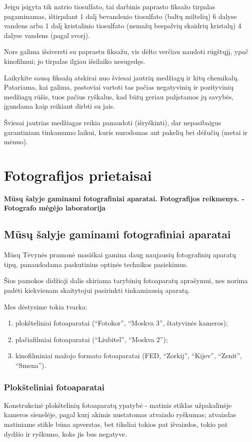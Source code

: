 \documentclass{book}
\begin{document}
				Jeigu įsigyta tik natrio tiosulfato, tai darbinis paprasto fiksažo tirpalas pagaminamas, ištirpdant 1 dalį bevandenio tiosulfato (baltų miltelių) 6 dalyse vandens arba 1 dalį kristalinio tiosulfato (nemažų bespalvių skaidrių kristalų) 4 dalyse vandens (pagal svorį).

				Nors galima išsiversti su paprastu fiksažu, vis dėlto verčiau naudoti rūgštųjį, ypač kinofilmui; jo tirpalas ilgiau išsilaiko nesugedęs.

				Laikykite sausą fiksažą atskirai nuo šviesai jautrių medžiagų ir kitų chemikalų.\\

				Patariama, kai galima, pastoviai vartoti tas pačias negatyvinių ir pozityvinių medžiagų rūšis, tuos pačius ryškalus, kad būtų geriau pažįstamos jų savybės, įgundama kaip reikiant dirbti su jais.

				Šviesai jautrias medžiagas reikia panaudoti (išryškinti), dar nepasibaigus garantiniam tinkamumo laikui, kuris nurodomas ant pakelių bei dėžučių (metai ir mėnuo).
	\chapter{Fotografijos prietaisai}
		\textbf{Mūsų šalyje gaminami fotografiniai aparatai. Fotografijos reikmenys. - Fotografo mėgėjo laboratorija}
		\section*{Mūsų šalyje gaminami fotografiniai aparatai}
			Mūsų Tėvynės pramonė masiškai gamina daug naujausių fotografinių aparatų tipų, panaudodama paskutinius optinės technikos pasiekimus.

			Šios pamokos didžioji dalis skiriama tarybinių fotoaparatų aprašymui, nes norima padėti kiekvienam skaitytojui pasirinkti tinkamiausią aparatą.

			Mes dėstysime tokia tvarka:
			\begin{enumerate}
				\item plokšteliniai fotoaparatai (``Fotokor'', ``Moskva 3'', štatyvinės kameros);
				\item plačiafilmiai fotoaparatai (``Liubitel'', ``Moskva 2'');
				\item kinofilminiai mažojo formato fotoaparatai (FED, ``Zorkij'', ``Kijev'', ``Zenit'', ``Smena'').
			\end{enumerate}
		\subsection*{Plokšteliniai fotoaparatai}
			Konstrukcinė plokštelinių fotoaparatų ypatybė - matinis stiklas užpakalinėje kameros sienelėje, pagal kurį akimis nustatomas atvaizdo ryškumas; atvaizdas matiniame stikle būna apverstas, bet tiksliai tokios pat išvaizdos, tokio pat dydžio ir ryškumo, koks jis bus negatyve.
\end{document}
